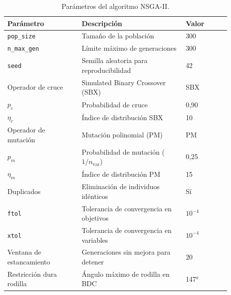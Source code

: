 \begin{table}[H]
      \caption{Parámetros del algoritmo NSGA-II.}
      \label{tab:params_nsga2}
      \centering
      \small
      \begin{tabular}{p{0.30\linewidth}p{0.42\linewidth}p{0.18\linewidth}}
            \toprule
            \textbf{Parámetro} & \textbf{Descripción} & \textbf{Valor} \\
            \midrule
            \texttt{pop\_size}       & Tamaño de la población                             & 300       \\
            \texttt{n\_max\_gen}    & Límite máximo de generaciones                      & 300       \\
            \texttt{seed}            & Semilla aleatoria para reproducibilidad            & 42        \\
            Operador de cruce        & Simulated Binary Crossover (SBX)                   & SBX       \\
            $p_c$                    & Probabilidad de cruce                              & 0{,}90    \\
            $\eta_c$                & Índice de distribución SBX                         & 10        \\
            Operador de mutación     & Mutación polinomial (PM)                           & PM        \\
            $p_m$                    & Probabilidad de mutación ($1/n_{\text{var}}$)     & 0{,}25    \\
            $\eta_m$                & Índice de distribución PM                          & 15        \\
            Duplicados               & Eliminación de individuos idénticos                & Sí        \\
            \texttt{ftol}            & Tolerancia de convergencia en objetivos            & $10^{-4}$ \\
            \texttt{xtol}            & Tolerancia de convergencia en variables            & $10^{-4}$ \\
            Ventana de estancamiento & Generaciones sin mejora para detener               & 20        \\
            Restricción dura rodilla & Ángulo máximo de rodilla en BDC                    & 147°      \\
            \bottomrule
      \end{tabular}
\end{table}

